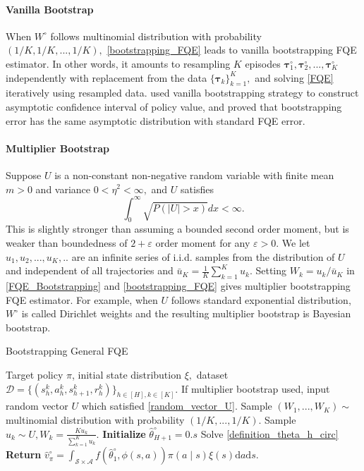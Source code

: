 \documentclass{article}
\numberwithin{equation}{section}
\theoremstyle{plain}
\theoremstyle{definition}
\theoremstyle{remark}
\begin{document}
\paragraph{Vanilla Bootstrap} When $W^\circ$ follows multinomial distribution with probability $(1/K,1/K,...,1/K),$ \eqref{bootstrapping_FQE} leads to vanilla bootstrapping FQE estimator. In other words, it amounts to resampling $K$ episodes $\boldsymbol{\tau}_1^{\circ},\boldsymbol{\tau}_2^{\circ},...,\boldsymbol{\tau}_K^\circ$ independently with replacement from the data $\{\boldsymbol{\tau}_k\}_{k=1}^{K},$ and solving \eqref{FQE} iteratively using resampled data. \citep{bootstrap} used vanilla bootstrapping strategy to construct asymptotic confidence interval of policy value, and proved that bootstrapping error has the same asymptotic distribution with standard FQE error.

\paragraph{Multiplier Bootstrap} Suppose $U$ is a non-constant non-negative random variable with finite mean $m > 0$ and variance $0 < \eta^2 < \infty,$ and $U$ satisfies
\begin{equation}\label{random_vector_U}
    \int_{0}^{\infty} \sqrt{P(|U|>x)} d x < \infty.
\end{equation}
This is slightly stronger than assuming a bounded second order moment, but is weaker than boundedness of $2+\varepsilon$ order moment for any $\varepsilon > 0.$ We let $u_1,u_2,...,u_K,..$ are an infinite series of i.i.d. samples from the distribution of $U$ and independent of all trajectories and $\bar{u}_K = \frac{1}{K}\sum_{k=1}^K u_k.$ Setting $W_k = u_k/\bar{u}_K$ in \eqref{FQE_Bootstrapping} and \eqref{bootstrapping_FQE} gives multiplier bootstrapping FQE estimator. For example, when $U$ follows standard exponential distribution, $W^\circ$ is called Dirichlet weights and the resulting multiplier bootstrap is Bayesian bootstrap\citep{rubin1981bayesian}.

\begin{algorithm}[htb!]
\caption{Bootstrapping General FQE}
\label{alg1}
	\begin{algorithmic}[1] 
		\Require Target policy $\pi$, initial state distribution $\xi,$ dataset $\mathcal{D}=\{(s^{k}_h,a^{k}_h,s^{k}_{h+1},r^{k}_h)\}_{h\in[H],k\in[K]}$. If multiplier bootstrap used, input random vector $U$ which satisfied \eqref{random_vector_U}.
		\State Sample $(W_1,...,W_K) \sim $ multinomial distribution with probability $(1/K,...,1/K).$
	    \State Sample $u_k \sim U, W_k = \frac{K u_k}{\sum_{k=1}^K u_k}.$
	    \EndIf
		\State \textbf{Initialize } $\widehat{\theta}_{H+1}^\circ = 0.s$
		\State Solve \eqref{definition_theta_h_circ}
		\EndFor
		\State\textbf{Return} $\widehat{v}_{\pi}^{\circ}=\int_{\mathcal{S} \times \mathcal{A}} f\left(\widehat{\theta}_{1}^{\circ}, \phi(s, a)\right) \pi(a \mid s) \xi(s) \mathrm{d} a \mathrm{d} s.$
	\end{algorithmic}
\end{algorithm}
\end{document}
